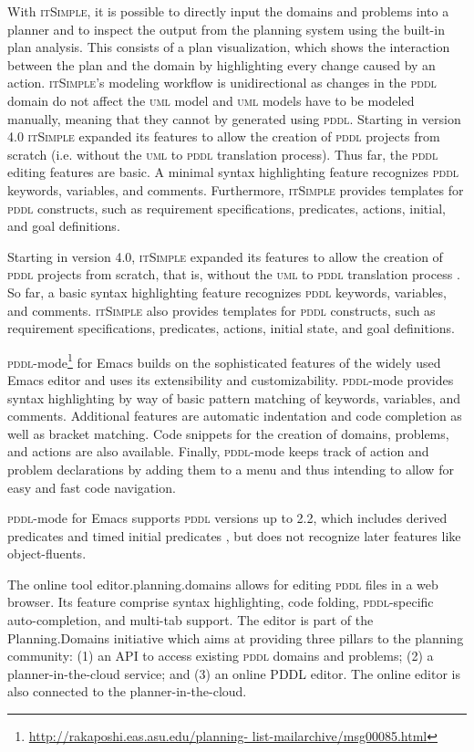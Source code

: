 \documentclass[runningheads]{llncs}
\newcommand{\epd}{editor.planning.domains\xspace}
\newcommand{\itsimple}{\textsc{itSimple}\xspace}
\newcommand{\pddlmode}{\textsc{pddl}-mode\xspace}
\newcommand{\pddl}{\textsc{pddl}\xspace}
\newcommand{\uml}{\textsc{uml}\xspace}
\begin{document}
With \itsimple, it is possible to directly input the domains and
problems into a planner and to inspect the output from the planning
system using the built-in plan analysis. This consists of a plan
visualization, which shows the interaction between the plan and the
domain by highlighting every change caused by an action. \itsimple's
modeling workflow is unidirectional as changes in the \pddl domain do
not affect the \uml model and \uml models have to be modeled manually,
meaning that they cannot by generated using \pddl. Starting in version
4.0 \cite{vaquero2012itsimple4} \itsimple expanded its features to
allow the creation of \pddl projects from scratch (i.e. without the
\uml to \pddl translation process). Thus far, the \pddl editing
features are basic. A minimal syntax highlighting feature recognizes
\pddl keywords, variables, and comments. Furthermore, \itsimple
provides templates for \pddl constructs, such as requirement
specifications, predicates, actions, initial, and goal definitions.

Starting in version 4.0, \itsimple expanded its features to allow the
creation of \pddl projects from scratch, that is, without the \uml to
\pddl translation process \cite{vaquero2012itsimple4}. So far, a basic
syntax highlighting feature recognizes \pddl keywords, variables, and
comments. \itsimple also provides templates for \pddl constructs, such
as requirement specifications, predicates, actions, initial state, and
goal definitions.

\pddlmode\footnote{\url{http://rakaposhi.eas.asu.edu/planning-
    list-mailarchive/msg00085.html}} for Emacs builds on the
sophisticated features of the widely used Emacs editor and uses its
extensibility and customizability. \pddlmode provides syntax
highlighting by way of basic pattern matching of keywords, variables,
and comments. Additional features are automatic indentation and code
completion as well as bracket matching. Code snippets for the creation
of domains, problems, and actions are also available. Finally,
\textsc{pddl}-mode keeps track of action and problem declarations by
adding them to a menu and thus intending to allow for easy and fast
code navigation.

\pddlmode for Emacs supports \textsc{pddl} versions up to
2.2, which includes derived predicates and timed initial predicates
\cite{edelkamp2004pddl2}, but does not recognize later features like
object-fluents.

The online tool \epd allows for editing \pddl files in a web
browser. Its feature comprise syntax highlighting, code folding,
\pddl-specific auto-completion, and multi-tab support. The editor is
part of the Planning.Domains initiative which aims at providing three
pillars to the planning community: (1) an API to access existing \pddl
domains and problems; (2) a planner-in-the-cloud service; and (3) an
online PDDL editor. The online editor is also connected to the
planner-in-the-cloud.
\end{document}

